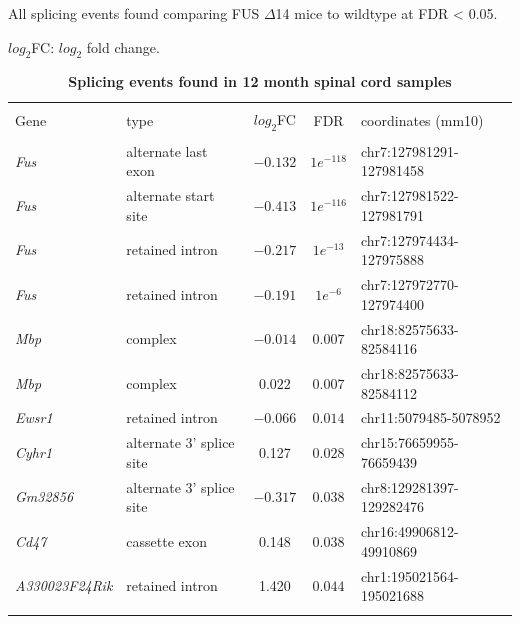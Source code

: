 \begin{table}[!htbp] 
	\centering 
	\caption{\textbf{Splicing events found in 12 month spinal cord samples}} 
	All splicing events found comparing FUS $\Delta$14 mice to wildtype at FDR < 0.05. 
	
	$log_2$FC: $log_2$ fold change.
	\label{tab:fus_mouse_splicing} 
	\begin{tabular}{@{\extracolsep{5pt}} llccl} 
		\\[-1.8ex]\hline 
		\hline \\[-1.8ex] 
		Gene & type & $log_2$FC & FDR & coordinates (mm10)\\ 
		\hline \\[-1.8ex] 
		\textit{Fus} & alternate last exon & $-0.132$ & $1e^{-118}$ & chr7:127981291-127981458 \\ 
		\textit{Fus} & alternate start site & $-0.413$ & $1e^{-116}$ & chr7:127981522-127981791 \\ 
		\textit{Fus} & retained intron & $-0.217$ & $1e^{-13}$ & chr7:127974434-127975888 \\ 
		\textit{Fus} & retained intron & $-0.191$ & $1e^{-6}$ & chr7:127972770-127974400 \\ 
		\textit{Mbp} & complex  & $-0.014$ & $0.007$ & chr18:82575633-82584116 \\ 
		\textit{Mbp} & complex & $0.022$ & $0.007$ & chr18:82575633-82584112 \\ 
		 \textit{Ewsr1} & retained intron & $-0.066$ & $0.014$ & chr11:5079485-5078952 \\ 
		\textit{Cyhr1} & alternate 3' splice site & 0.127 & $0.028$ & chr15:76659955-76659439 \\ 
		\textit{Gm32856} & alternate 3' splice site & $-0.317$ & $0.038$ & chr8:129281397-129282476 \\ 
		\textit{Cd47} & cassette exon & 0.148 & $0.038$ & chr16:49906812-49910869 \\ 
		\textit{A330023F24Rik} & retained intron & 1.420 & $0.044$ & chr1:195021564-195021688 \\ 
		\hline \\[-1.8ex] 
	\end{tabular} 
\end{table} 



